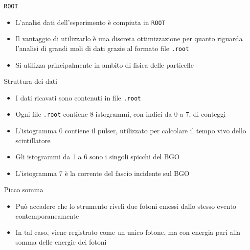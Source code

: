 \documentclass [xcolor=svgnames, 9pt] {beamer}
\begin{document}
\begin{frame}[noframenumbering]{\texttt{ROOT}}
	\begin{itemize}
		\item L'analisi dati dell'esperimento è compiuta in \texttt{ROOT}
		\item Il vantaggio di utilizzarlo è una discreta ottimizzazione per quanto riguarda l'analisi di grandi moli di dati grazie al formato file \texttt{.root}
		\item Si utilizza principalmente in ambito di fisica delle particelle
	\end{itemize}
\end{frame}


\begin{frame}[noframenumbering]{Struttura dei dati}
	\begin{itemize}
			\item I dati ricavati sono contenuti in file \texttt{.root}
			\item Ogni file \texttt{.root} contiene 8 istogrammi, con indici da 0 a 7, di conteggi
			\item L'istogramma 0 contiene il pulser, utilizzato per calcolare il tempo vivo dello scintillatore
			\item Gli istogrammi da 1 a 6 sono i singoli spicchi del BGO
			\item L'istogramma 7 è la corrente del fascio incidente sul BGO
		\end{itemize}
\end{frame}

\begin{frame}[noframenumbering]{Picco somma}
	\begin{itemize}
		\item Può accadere che lo strumento riveli due fotoni emessi dallo stesso evento contemporaneamente
		\item In tal caso, viene registrato come un unico fotone, ma con energia pari alla somma delle energie dei fotoni 
	\end{itemize}
\end{frame}
\end{document}
